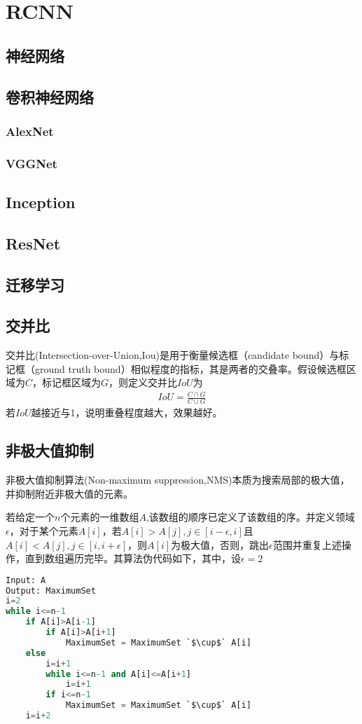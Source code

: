 \section{RCNN}
\subsection{神经网络}
\subsection{卷积神经网络}
\subsubsection{AlexNet}
\subsubsection{VGGNet}
\subsection{Inception}
\subsection{ResNet}

\subsection{迁移学习}
\subsection{交并比}
交并比(Intersection-over-Union,Iou)是用于衡量候选框（candidate bound）与标记框（ground truth bound）相似程度的指标，其是两者的交叠率。假设候选框区域为$C$，标记框区域为$G$，则定义交并比$IoU$为
\begin{eqnarray}
IoU=\frac{C\cap G}{C\cup G}
\end{eqnarray}
若$IoU$越接近与1，说明重叠程度越大，效果越好。
\subsection{非极大值抑制}
非极大值抑制算法(Non-maximum suppression,NMS)本质为搜索局部的极大值，并抑制附近非极大值的元素。

若给定一个$n$个元素的一维数组$A$,该数组的顺序已定义了该数组的序。并定义领域$\epsilon$，对于某个元素$A[i]$，若$A[i]>A[j],j\in[i-\epsilon,i]$且$A[i]<A[j],j\in[i,i+\epsilon]$，则$A[i]$为极大值，否则，跳出$\epsilon$范围并重复上述操作，直到数组遍历完毕。其算法伪代码如下，其中，设$\epsilon=2$
\begin{lstlisting}[language=python]
Input: A
Output: MaximumSet
i=2
while i<=n-1
    if A[i]>A[i-1]
    	if A[i]>A[i+1]
            MaximumSet = MaximumSet `$\cup$` A[i]
    else
    	i=i+1
    	while i<=n-1 and A[i]<=A[i+1]
    		i=i+1
    	if i<=n-1
    		MaximumSet = MaximumSet `$\cup$` A[i]
    i=i+2
\end{lstlisting}


